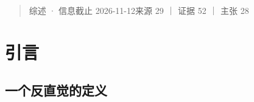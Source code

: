 
\begin{quote}\small
综述 · 信息截止 2026-11-12来源 29 ｜ 证据 52 ｜ 主张 28

\end{quote}

\begin{abstract}

2026 年 9 月，智谱发布了关于 GLM 推理基础设施自优化的工程报告，提出一个反直觉的主张：所谓「密集反馈」不是把尽可能多的日志和指标喂给 agent，而是反馈必须同时满足三条属性——足够局部、便宜且及时、可客观验证。本文以该报告为锚点，系统梳理了 29 项相关工作，试图回答一个比「谁快了多少倍」更要紧的问题：\textbf{在推理系统优化这一环上，递归自我改进（Recursive Self-Improvement, RSI）究竟走到了哪一步，阻碍它继续往上的是什么。}


本文的贡献有三。其一，提出一个按\textbf{反馈构造方式}而非按任务类型划分的四层谱系（L1 单点工具  L2 闭环优化  L3 元级改进  L4 严格 RSI），并给出每层的可判定判据，据此定位 12 个代表工作。其二，给出一个与直觉相反的结论：\textbf{反馈的价值不取决于体量，也不取决于模型强弱，而取决于上述三属性}；KOPE 在把优化 token 消耗从 15.9B 降到 1.113B 的同时把通过率从 60.0\% 提到 84.6\%，是这一论断最干净的证据。其三，收集并并列呈现了\textbf{指向相反方向的证据}：InferenceBench 发现同等时间预算下 agent 打不过简单超参搜索；KernelBench-Verified 收紧测量协议后，同一批模型的几何平均加速比从 1.43× 掉到 0.88×{\scriptsize\texttt{[c-\hspace{0pt}judge-\hspace{0pt}flip]}}。我们主张，这两组结果与锚点并不矛盾，它们共同界定了这类方法的\textbf{适用边界}{\scriptsize\texttt{[c-\hspace{0pt}agent-\hspace{0pt}vs-\hspace{0pt}search]}}。


本文同时是一份方法自省报告。我们在检索过程中三次因方法缺陷整体漏掉关键工作，其中一次是用旧归档的产物做新归档的检索，导致「没被收录」被误当成「查不到」。这些失误与修正过程一并记录，因为对综述而言，\textbf{召回缺陷比结论错误更隐蔽}。


\textbf{关键词}：递归自我改进；推理系统优化；agentic 工程；反馈设计；LLM 基础设施



\end{abstract}
\section{引言}

\subsection{一个反直觉的定义}

